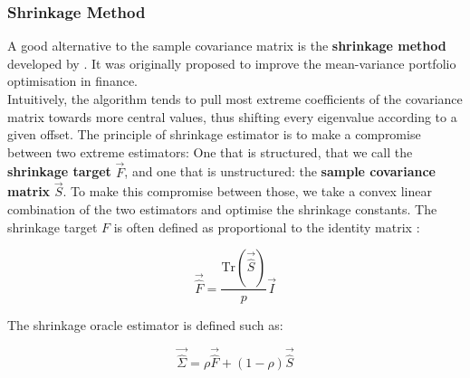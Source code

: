\subsubsection{Shrinkage Method}

%
%
%
%
%
%

A good alternative to the sample covariance matrix is the \textbf{shrinkage method} developed by \citet{ledoit_improved_2003}. It was originally proposed to improve the mean-variance portfolio optimisation in finance. \\

Intuitively, the algorithm tends to pull most extreme coefficients of the covariance matrix towards more central values, thus shifting every eigenvalue according to a given offset. The principle of shrinkage estimator is to make a compromise between two extreme estimators: One that is structured, that we call the \textbf{shrinkage target} $\vec{F}$, and one that is unstructured: the\textbf{ sample covariance matrix } $\vec{S}$. To make this compromise between those, we take a convex linear combination of the two estimators and optimise the shrinkage constants. The shrinkage target $F$ is often defined as proportional to the identity matrix \citet{chen_shrinkage_2010}: 

\begin{equation}
    \vec{\hat{F}} = \frac{\text{Tr}(\vec{\hat{S}})}{p} \vec{I}
\end{equation}

The shrinkage oracle estimator is defined such as:

\begin{equation}
    \vec{\hat{\Sigma}} = \rho\vec{\hat{F}} + (1- \rho )\vec{\hat{S}}
    \label{equ:oracle}
\end{equation}

